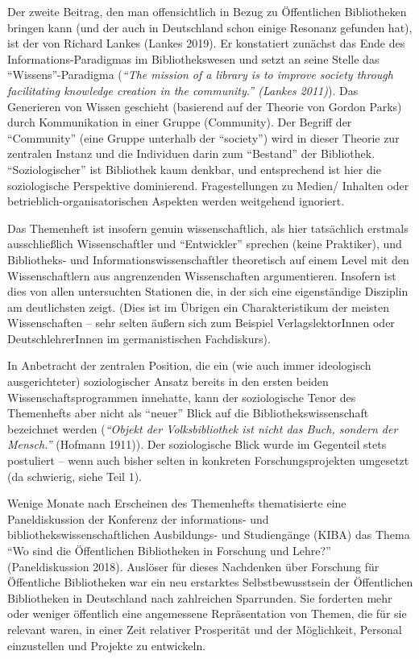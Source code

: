 \documentclass[a4paper,
fontsize=11pt,
oneside,
numbers=noperiodatend,
parskip=half-,
bibliography=totoc,
final
]{scrartcl}
\begin{document}
Der zweite Beitrag, den man offensichtlich in Bezug zu Öffentlichen
Bibliotheken bringen kann (und der auch in Deutschland schon einige
Resonanz gefunden hat), ist der von Richard Lankes (Lankes 2019). Er
konstatiert zunächst das Ende des Informations-Paradigmas im
Bibliothekswesen und setzt an seine Stelle das
\enquote{Wissens}-Paradigma (\emph{\enquote{The mission of a library is
to improve society through facilitating knowledge creation in the
community.} (Lankes 2011)}). Das Generieren von Wissen geschieht
(basierend auf der Theorie von Gordon Parks) durch Kommunikation in
einer Gruppe (Community). Der Begriff der \enquote{Community} (eine
Gruppe unterhalb der \enquote{society}) wird in dieser Theorie zur
zentralen Instanz und die Individuen darin zum \enquote{Bestand} der
Bibliothek. \enquote{Soziologischer} ist Bibliothek kaum denkbar, und
entsprechend ist hier die soziologische Perspektive dominierend.
Fragestellungen zu Medien/ Inhalten oder betrieblich-organisatorischen
Aspekten werden weitgehend ignoriert.

Das Themenheft ist insofern genuin wissenschaftlich, als hier
tatsächlich erstmals ausschließlich Wissenschaftler und
\enquote{Entwickler} sprechen (keine Praktiker), und Bibliotheks- und
Informationswissenschaftler theoretisch auf einem Level mit den
Wissenschaftlern aus angrenzenden Wissenschaften argumentieren. Insofern
ist dies von allen untersuchten Stationen die, in der sich eine
eigenständige Disziplin am deutlichsten zeigt. (Dies ist im Übrigen ein
Charakteristikum der meisten Wissenschaften -- sehr selten äußern sich
zum Beispiel VerlagslektorInnen oder DeutschlehrerInnen im
germanistischen Fachdiskurs).

In Anbetracht der zentralen Position, die ein (wie auch immer
ideologisch ausgerichteter) soziologischer Ansatz bereits in den ersten
beiden Wissenschaftsprogrammen innehatte, kann der soziologische Tenor
des Themenhefts aber nicht als \enquote{neuer} Blick auf die
Bibliothekswissenschaft bezeichnet werden (\emph{\enquote{Objekt der
Volksbibliothek ist nicht das Buch, sondern der Mensch.}} (Hofmann
1911)). Der soziologische Blick wurde im Gegenteil stets postuliert --
wenn auch bisher selten in konkreten Forschungsprojekten umgesetzt (da
schwierig, siehe Teil 1).

Wenige Monate nach Erscheinen des Themenhefts thematisierte eine
Paneldiskussion der Konferenz der informations- und
bibliothekswissenschaftlichen Ausbildungs- und Studiengänge (KIBA) das
Thema \enquote{Wo sind die Öffentlichen Bibliotheken in Forschung und
Lehre?} (Paneldiskussion 2018). Auslöser für dieses Nachdenken über
Forschung für Öffentliche Bibliotheken war ein neu erstarktes
Selbstbewusstsein der Öffentlichen Bibliotheken in Deutschland nach
zahlreichen Sparrunden. Sie forderten mehr oder weniger öffentlich eine
angemessene Repräsentation von Themen, die für sie relevant waren, in
einer Zeit relativer Prosperität und der Möglichkeit, Personal
einzustellen und Projekte zu entwickeln.
\end{document}
